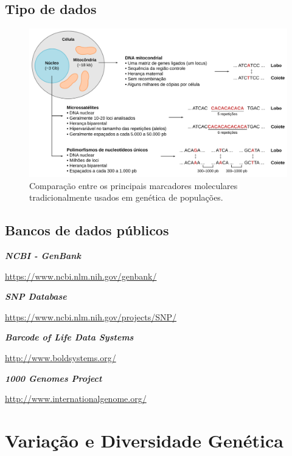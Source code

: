 \documentclass[
]{book}
\begin{document}
\hypertarget{tipo-de-dados}{%
\section{Tipo de dados}\label{tipo-de-dados}}

\begin{figure}

{\centering \includegraphics[width=800px]{figs/main_markers} 

}

\caption{Comparação entre os principais marcadores moleculares tradicionalmente usados em genética de populações.}\label{fig:mainmarkers}
\end{figure}

\hypertarget{bancos-de-dados-puxfablicos}{%
\section{Bancos de dados públicos}\label{bancos-de-dados-puxfablicos}}

\textbf{\emph{NCBI - GenBank}}

\url{https://www.ncbi.nlm.nih.gov/genbank/}

\textbf{\emph{SNP Database}}

\url{https://www.ncbi.nlm.nih.gov/projects/SNP/}

\textbf{\emph{Barcode of Life Data Systems}}

\url{http://www.boldsystems.org/}

\textbf{\emph{1000 Genomes Project}}

\url{http://www.internationalgenome.org/}

\hypertarget{variauxe7uxe3o-e-diversidade-genuxe9tica}{%
\chapter{Variação e Diversidade Genética}\label{variauxe7uxe3o-e-diversidade-genuxe9tica}}
\end{document}

